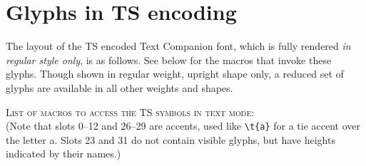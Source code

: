 \documentclass{article}
\begin{document}
\section{Glyphs in TS encoding}
The layout of the TS encoded Text Companion font, which is fully rendered \emph{in regular style only}, is as follows. See below for the macros that invoke these glyphs. Though shown in regular weight, upright shape only, a reduced set of  glyphs are available in all other weights and shapes.


\textsc{List of macros to access the TS symbols in text mode:}\\
(Note that slots 0--12 and 26--29 are accents, used like \verb|\t{a}| for a tie accent over the letter a. Slots 23 and 31 do not contain visible glyphs, but have heights indicated by their names.)
\end{document}
